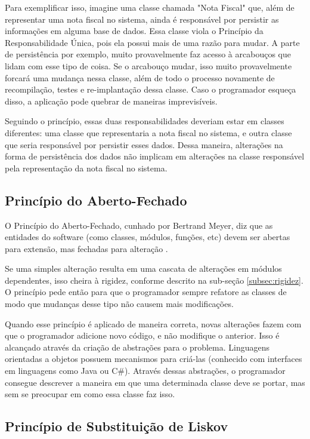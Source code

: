 Para exemplificar isso, imagine uma classe chamada "Nota Fiscal" que, além de
representar uma nota fiscal no sistema, ainda é responsável por persistir as 
informações em alguma base de dados. Essa classe viola o Princípio da
Responsabilidade Única, pois ela possui mais de uma razão para mudar. A parte de
persistência por exemplo, muito provavelmente faz acesso à arcabouços que lidam 
com esse tipo de coisa. Se o arcabouço mudar, isso muito provavelmente forcará
uma  mudança nessa classe, além de todo o processo novamente de recompilação, 
testes e re-implantação dessa classe. Caso o programador esqueça disso, a
aplicação pode quebrar de maneiras imprevisíveis.

Seguindo o princípio, essas duas responsabilidades deveriam estar em classes 
diferentes: uma classe que representaria a nota fiscal no sistema, e outra
classe que seria responsável por persistir esses dados. Dessa maneira,
alterações na forma de persistência dos dados não implicam em alterações na 
classe responsável pela representação da nota fiscal no sistema.

\subsection{Princípio do Aberto-Fechado}
\label{subsec:ocp}

O Princípio do Aberto-Fechado, cunhado por Bertrand Meyer, diz que as entidades
do software (como classes, módulos, funções, etc) devem ser abertas para
extensão, mas fechadas para alteração \cite{meyer-ocp}. 

Se uma simples alteração resulta em uma cascata de alterações em módulos
dependentes, isso cheira à rigidez, conforme descrito na sub-seção 
\ref{subsec:rigidez}. O princípio pede então para que o programador sempre 
refatore as classes de modo que mudanças desse tipo não causem mais modificações.

Quando esse princípio é aplicado de maneira correta, novas alterações fazem com
que o programador adicione novo código, e não modifique o anterior. Isso é
alcançado através da criação de abstrações para o problema. Linguagens
orientadas a objetos possuem mecanismos para criá-las (conhecido com interfaces
em linguagens como Java ou C\#). Através dessas abstrações, o programador consegue 
descrever a maneira em que uma determinada classe deve se portar, mas sem se
preocupar em como essa classe faz isso.

\subsection{Princípio de Substituição de Liskov}
\label{subsec:lsp}

